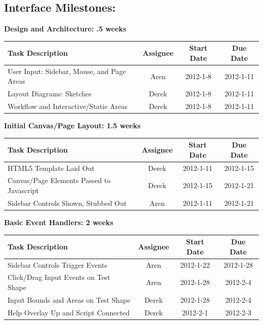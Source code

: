 \documentclass[12pt, letterpaper]{article}
\begin{document}
  \subsection{Interface Milestones:}
	
  \begin{center}
		{\bf Design and Architecture: .5 weeks}
    \begin{tabular}{| p{8.3cm} || c | c | c | }
      \hline
      Task Description & Assignee & Start Date & Due Date \\
      \hline
	    User Input: Sidebar, Mouse, and Page Areas & Aren & 2012-1-8 & 2012-1-11 \\
	    Layout Diagrams: Sketches & Derek & 2012-1-8 & 2012-1-11 \\
	    Workflow and Interactive/Static Areas & Derek & 2012-1-8 & 2012-1-11 \\
      \hline
    \end{tabular}
  \end{center}

  \begin{center}
		{\bf Initial Canvas/Page Layout: 1.5 weeks}
    \begin{tabular}{| p{8.3cm} || c | c | c | }
      \hline
      Task Description & Assignee & Start Date & Due Date \\
      \hline
	    HTML5 Template Laid Out & Derek & 2012-1-11 & 2012-1-15 \\
	    Canvas/Page Elements Passed to Javascript & Derek & 2012-1-15 & 2012-1-21 \\
	    Sidebar Controls Shown, Stubbed Out & Aren & 2012-1-11 & 2012-1-21 \\
      \hline
    \end{tabular}
  \end{center}

  \begin{center}
		{\bf Basic Event Handlers: 2 weeks}
    \begin{tabular}{| p{8.3cm} || c | c | c | }
      \hline
      Task Description & Assignee & Start Date & Due Date \\
      \hline
 	    Sidebar Controls Trigger Events & Aren & 2012-1-22 & 2012-1-28 \\
	    Click/Drag Input Events on Test Shape & Aren & 2012-1-28 & 2012-2-4 \\
	    Input Bounds and Areas on Test Shape & Derek & 2012-1-28 & 2012-2-4 \\
        Help Overlay Up and Script Connected & Derek & 2012-2-1 & 2012-2-3 \\
      \hline
    \end{tabular}
  \end{center}
\end{document}
